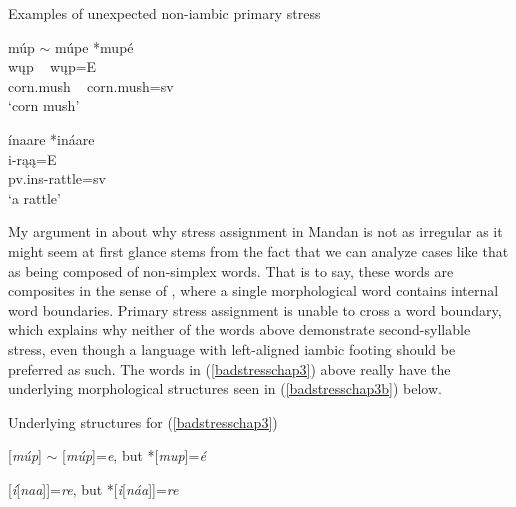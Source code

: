 \begin{exe}
\item\label{badstresschap3} Examples of unexpected non-iambic primary stress

	\begin{xlist}
	
	\item \glll múp $\sim$ múpe *mupé\\
	wųp ~ wųp=E\\
	\textnormal{corn.mush} ~ \textnormal{corn.mush}=sv\\
	\glt `corn mush' \citep[274]{hollow1970}

	\item \glll ínaare *ináare\\
	i-rąą=E\\
	pv.ins-\textnormal{rattle}=sv\\
	\glt `a rattle' \citep[93]{hollow1970}
	
	\end{xlist}

\end{exe}

My argument in  about why stress assignment in Mandan is not as irregular as it might seem at first glance stems from the fact that we can analyze cases like that as being composed of non-simplex words. That is to say, these words are composites in the sense of \citet[310]{anderson1992}, where a single morphological word contains internal word boundaries. Primary stress assignment is unable to cross a word boundary, which explains why neither of the words above demonstrate second-syllable stress, even though a language with left-aligned iambic footing should be preferred as such. The words in (\ref{badstresschap3}) above really have the underlying morphological structures seen in (\ref{badstresschap3b}) below.

\begin{exe}
\item\label{badstresschap3b} Underlying structures for (\ref{badstresschap3})

	\begin{xlist}
	
	\item\label{badstresschap3b1}  {[}\textit{múp}] $\sim$ [\textit{múp}]=\textit{e}, but *[\textit{mup}]=\textit{é}


	\item\label{badstresschap3b2}{[}\textit{í}[\textit{naa}]]=\textit{re}, but *[\textit{i}[\textit{náa}]]=\textit{re}
	
	\end{xlist}

\end{exe}

